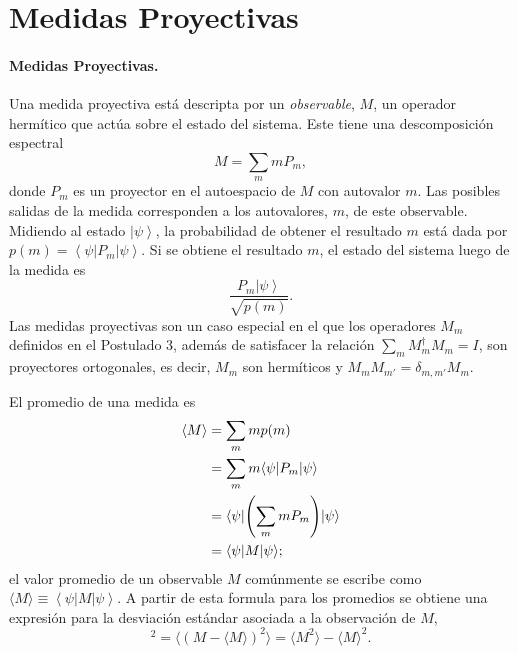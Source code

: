 \section{Medidas Proyectivas}

\paragraph{Medidas Proyectivas.} 

Una medida proyectiva está descripta por un \emph{observable}, $M$, un operador hermítico que actúa sobre el estado del sistema.
Este tiene una descomposición espectral 
\begin{equation*}
M = \sum_m mP_m,
\end{equation*}
donde $P_m$ es un proyector en el autoespacio de $M$ con autovalor $m$.
Las posibles salidas de la medida corresponden a los autovalores,
$m$, de este observable. Midiendo al estado
$\left|\psi\right\rangle$, la probabilidad de obtener el resultado $m$ está
dada por $p(m) = \left\langle\psi |  P_m |\psi\right\rangle.$ Si se obtiene el resultado $m$,
el estado del sistema luego de la medida es
\begin{equation*}
\frac{P_m\left|\psi\right\rangle}{\sqrt{p(m)}}.
\end{equation*}
Las medidas proyectivas son un caso especial en el que los operadores $M_m$ definidos en el Postulado 3, además de satisfacer la relación $\sum_m M_m^\dagger M_m = I$, 
son proyectores ortogonales, es decir, $M_m$ son hermíticos y $M_mM_{m'} = \delta_{m, m'}M_m$.

El promedio de una medida es \begin{align*}
  \langle M \rangle
  &= \sum_m mp(m) \\
  &= \sum_m m\mel{\psi}{P_m}{\psi} \\
  &= \bra{\psi}\left(\sum_m mP_m\right)\ket{\psi} \\
  &= \mel{\psi}{M}{\psi};
\end{align*}
  el valor promedio de un observable $M$ comúnmente se escribe como
  $\langle M \rangle \equiv \left\langle\psi |  M |\psi\right\rangle$. A partir de esta formula para 
  los promedios se obtiene una expresión para la desviación estándar asociada a la observación de $M$,
\begin{equation*}
[\Delta(M)]^2 = \langle (M - \langle M \rangle)^2 \rangle = \langle M^2
  \rangle - \langle M \rangle^2.
  \end{equation*}


